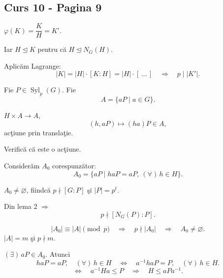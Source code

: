 
\subsection*{Curs 10 - Pagina 9}

\noindent $\varphi(K)=\dfrac{K}{H}=K'.$

\medskip
\noindent Iar $H\trianglelefteq K$ pentru că $H\trianglelefteq N_G(H)$.

\medskip
\noindent Aplicăm Lagrange:
\[
|K|=|H|\cdot[K:H]=|H|\cdot[\,\ldots\,]
\quad\Longrightarrow\quad p\mid|K'|.
\]

\bigskip
\noindent{}

\medskip
\noindent Fie $P\in\operatorname{Syl}_p(G)$. Fie
\[
A=\{aP\mid a\in G\}.
\]

\noindent $H\times A\longrightarrow A$,
\[
(h,aP)\longmapsto(ha)P\in A,
\]
\noindent acţiune prin translaţie.

\noindent Verifică că este o acţiune.

\medskip
\noindent Considerăm $A_0$ corespunzător:
\[
A_0=\{aP\mid haP=aP,\ (\forall)\,h\in H\}.
\]

\noindent $A_0\neq\varnothing$, fiindcă $p\nmid[G:P]$ şi
$|P|=p^t$.

\medskip
\noindent Din lema 2 $\Longrightarrow$
\[
p\nmid[N_G(P):P].
\]

\medskip
\noindent
\[
|A_0|\equiv|A|\pmod p
\quad\Longrightarrow\quad p\nmid|A_0|
\quad\Longrightarrow\quad A_0\neq\varnothing.
\]
\noindent $|A|=m$ şi $p\nmid m$.

\medskip
\noindent $(\exists)\,aP\in A_0$. Atunci
\[
haP=aP,\quad(\forall)\,h\in H
\quad\Longleftrightarrow\quad
 a^{-1}haP=P,\quad(\forall)\,h\in H.
\]
\[
\Longleftrightarrow\quad a^{-1}Ha\leq P
\quad\Longrightarrow\quad H\leq aPa^{-1}.
\]

